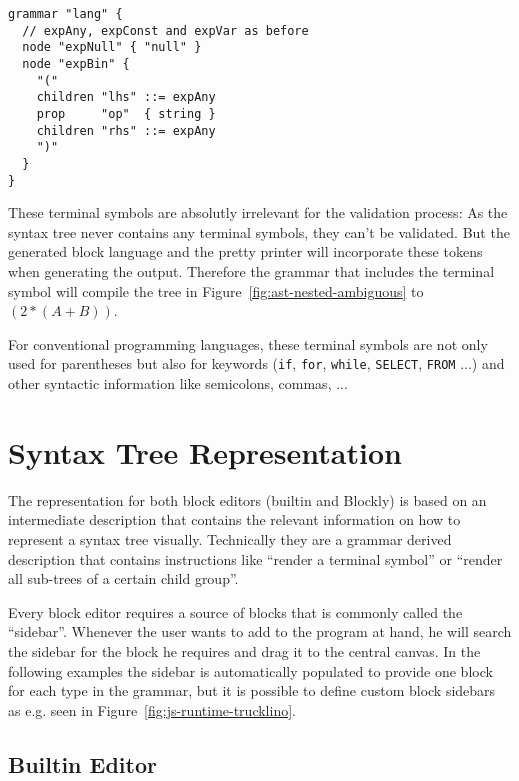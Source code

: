 \documentclass[sigconf,natbib=false]{acmart}
\newcommand{\enquote}[1]{``#1''}
\begin{document}
\begin{lstlisting}[caption={Final syntactic grammar for expression \texttt{expBin}}, label=lst:grammar-expr-expBin-syntax]
grammar "lang" {
  // expAny, expConst and expVar as before
  node "expNull" { "null" }
  node "expBin" {
    "("
    children "lhs" ::= expAny
    prop     "op"  { string }
    children "rhs" ::= expAny
    ")"
  }
}
\end{lstlisting}

These terminal symbols are absolutly irrelevant for the validation process: As the syntax tree never contains any terminal symbols, they can't be validated. But the generated block language and the pretty printer will incorporate these tokens when generating the output. Therefore the grammar that includes the terminal symbol will compile the tree in Figure~\ref{fig:ast-nested-ambiguous} to $(2 * (A + B))$.

For conventional programming languages, these terminal symbols are not only used for parentheses but also for keywords (\texttt{if}, \texttt{for}, \texttt{while}, \texttt{SELECT}, \texttt{FROM} ...) and other syntactic information like semicolons, commas, ...

\section{Syntax Tree Representation}

The representation for both block editors (builtin and Blockly) is based on an intermediate description that contains the relevant information on how to represent a syntax tree visually. Technically they are a grammar derived description that contains instructions like \enquote{render a terminal symbol} or \enquote{render all sub-trees of a certain child group}.

Every block editor requires a source of blocks that is commonly called the \enquote{sidebar}. Whenever the user wants to add to the program at hand, he will search the sidebar for the block he requires and drag it to the central canvas. In the following examples the sidebar is automatically populated to provide one block for each type in the grammar, but it is possible to define custom block sidebars as e.g. seen in Figure~\ref{fig:js-runtime-trucklino}.

\subsection{Builtin Editor}
\end{document}
